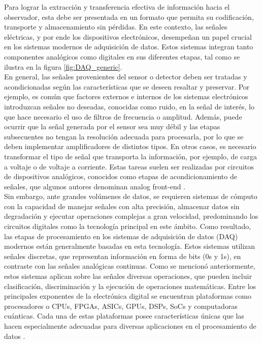 \documentclass[]{book}
\begin{document}
\noindent Para lograr la extracción y transferencia efectiva de información hacia el observador, esta debe ser presentada en un formato que permita su codificación, transporte y almacenamiento sin pérdidas. En este contexto, las señales eléctricas, y por ende los dispositivos electrónicos, desempeñan un papel crucial en los sistemas modernos de adquisición de datos. Estos sistemas integran tanto componentes analógicos como digitales en sus diferentes etapas, tal como se ilustra en la figura \ref{fig:DAQ_generic}. \\

\noindent En general, las señales provenientes del sensor o detector deben ser tratadas y acondicionadas según las características que se deseen resaltar y preservar. Por ejemplo, es común que factores externos e internos de los sistemas electrónicos introduzcan señales no deseadas, conocidas como ruido, en la señal de interés, lo que hace necesario el uso de filtros de frecuencia o amplitud. Además, puede ocurrir que la señal generada por el sensor sea muy débil y las etapas subsecuentes no tengan la resolución adecuada para procesarla, por lo que se deben implementar amplificadores de distintos tipos. En otros casos, es necesario transformar el tipo de señal que transporta la información, por ejemplo, de carga a voltaje o de voltaje a corriente. Estas tareas suelen ser realizadas por circuitos de dispositivos analógicos, conocidos como etapas de acondicionamiento de señales, que algunos autores denominan analog front-end \cite{kledrowetz2023fully}.\\

\noindent Sin embargo, ante grandes volúmenes de datos, se requieren sistemas de cómputo con la capacidad de manejar señales con alta precisión, almacenar datos sin degradación y ejecutar operaciones complejas a gran velocidad, predominando los circuitos digitales como la tecnología principal en este ámbito. Como resultado, las etapas de procesamiento en los sistemas de adquisición de datos (DAQ) modernos están generalmente basadas en esta tecnología. Estos sistemas utilizan señales discretas, que representan información en forma de bits (0s y 1s), en contraste con las señales analógicas continuas. Como se mencionó anteriormente, estos sistemas aplican sobre las señales diversas operaciones, que pueden incluir clasificación, discriminación y la ejecución de operaciones matemáticas. Entre los principales exponentes de la electrónica digital se encuentran plataformas como procesadores o CPUs, FPGAs, ASICs, GPUs, DSPs, SoCs y computadoras cuánticas. Cada una de estas plataformas posee características únicas que las hacen especialmente adecuadas para diversas aplicaciones en el procesamiento de datos \cite{proakis2007digital}.\\
\end{document}
